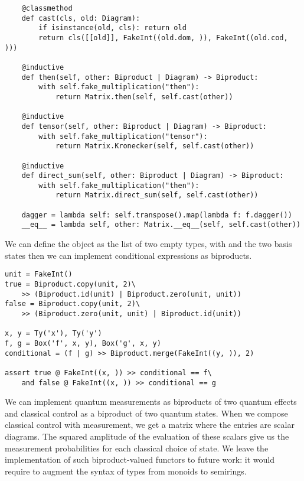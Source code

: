 \begin{python}
\begin{verbatim}
    @classmethod
    def cast(cls, old: Diagram):
        if isinstance(old, cls): return old
        return cls([[old]], FakeInt((old.dom, )), FakeInt((old.cod, )))

    @inductive
    def then(self, other: Biproduct | Diagram) -> Biproduct:
        with self.fake_multiplication("then"):
            return Matrix.then(self, self.cast(other))

    @inductive
    def tensor(self, other: Biproduct | Diagram) -> Biproduct:
        with self.fake_multiplication("tensor"):
            return Matrix.Kronecker(self, self.cast(other))

    @inductive
    def direct_sum(self, other: Biproduct | Diagram) -> Biproduct:
        with self.fake_multiplication("then"):
            return Matrix.direct_sum(self, self.cast(other))

    dagger = lambda self: self.transpose().map(lambda f: f.dagger())
    __eq__ = lambda self, other: Matrix.__eq__(self, self.cast(other))
\end{verbatim}
\end{python}

\begin{example}
We can define the object  as the list of two empty types, with  and  the two basis states
then we can implement conditional expressions as biproducts.

\begin{verbatim}
unit = FakeInt()
true = Biproduct.copy(unit, 2)\
    >> (Biproduct.id(unit) | Biproduct.zero(unit, unit))
false = Biproduct.copy(unit, 2)\
    >> (Biproduct.zero(unit, unit) | Biproduct.id(unit))

x, y = Ty('x'), Ty('y')
f, g = Box('f', x, y), Box('g', x, y)
conditional = (f | g) >> Biproduct.merge(FakeInt((y, )), 2)

assert true @ FakeInt((x, )) >> conditional == f\
    and false @ FakeInt((x, )) >> conditional == g
\end{verbatim}
\end{example}

\begin{example}\label{example:biproduct-measurement}
We can implement quantum measurements as biproducts of two quantum effects and classical control as a biproduct of two quantum states.
When we compose classical control with measurement, we get a matrix where the entries are scalar diagrams.
The squared amplitude of the evaluation of these scalars give us the measurement probabilities for each classical choice of state.
We leave the implementation of such biproduct-valued functors to future work: it would require to augment the syntax of types from monoids to semirings.
\end{example}


